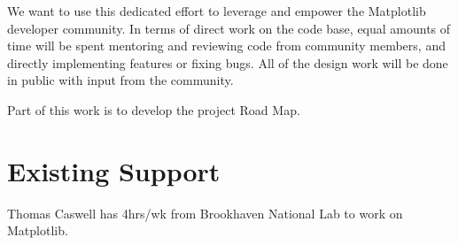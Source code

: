\documentclass[11pt,letterpaper]{article}  %
\begin{document}
We want to use this dedicated effort to leverage and empower the
Matplotlib developer community.  In terms of direct work on the code
base, equal amounts of time will be spent mentoring and reviewing
code from community members, and directly implementing features
or fixing bugs.  All of the design work will be done in public with
input from the community.

Part of this work is to develop the project Road Map.



\section{Existing Support}

Thomas Caswell has 4hrs/wk from Brookhaven National Lab to work on
Matplotlib.


\clearpage

\end{document}
